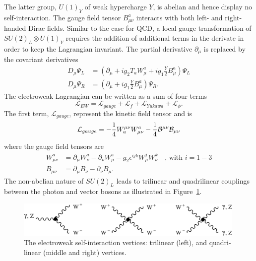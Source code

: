 The latter group, $U(1)_Y$ of weak hypercharge $Y$, is abelian and hence display no self-interaction. The gauge field tensor $B_{\mu\nu}^a$ interacts with both left- and right-handed Dirac fields. Similar to the case for QCD, a local gauge transformation of $SU (2)_L \otimes U(1)_Y$ requires the addition of additional terms in the derivate in order to keep the Lagrangian invariant. The partial derivative $\partial_{\mu}$ is replaced by the covariant derivatives
\begin{align}
  \label{eq:theory:ewcov}
  D_\mu \Psi_L &=(\partial_{\mu} + ig_2 T_a W_{\mu}^a + ig_1 \frac{Y}{2} B_{\mu}^a)\Psi_L\\
  D_\mu \Psi_R &=(\partial_{\mu} + ig_1 \frac{Y}{2} B_{\mu}^a)\Psi_R.
\end{align}
The electroweak Lagrangian can be written as a sum of four terms
\begin{equation}
  \label{eq:theory:ewl}
   \mathcal{L}_{EW} = \mathcal{L}_{gauge}+\mathcal{L}_{f}+\mathcal{L}_{Yukawa}+\mathcal{L}_{\phi}.
\end{equation}
The first term, $\mathcal{L}_{gauge}$, represent the kinetic field tensor and is
\begin{equation}
  \label{eq:theory:gauge}
   \mathcal{L}_{gauge} = -\frac{1}{4}W_{a}^{\mu\nu}W^{a}_{\mu\nu} - \frac{1}{4}{\cal B}^{\mu\nu}{\cal B}_{\mu\nu}
\end{equation}
where the gauge field tensors are
\begin{align}
W_{\mu\nu}^a &=\partial_{\mu} W_{\nu}^a-\partial_{\nu} W_{\mu}^a-g_2\epsilon^{ijk}W^{j}_{\mu}W^{k}_{\nu} \quad \textrm{, with   } i=1-3\\
B_{\mu\nu} &=\partial_{\mu} B_{\nu}-\partial_{\nu} B_{\mu}.
\end{align}
The non-abelian nature of $SU (2)_L$ leads to trilinear and quadrilinear couplings between the photon and vector bosons as illustrated in Figure~\ref{fig:theory:weakint}.\newline
\begin{figure}[h!]
\centering
\includegraphics[width=0.99\textwidth]{figures/theory/weak_selfinteraction.png}
\caption{The electroweak self-interaction vertices: trilinear (left), and quadri-linear (middle and right) vertices.}
\label{fig:theory:weakint}
\end{figure}
